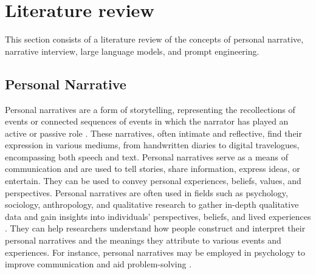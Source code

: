 \chapter{Literature review}
\label{cha:literature_review}
This section consists of a literature review of the concepts of personal narrative, narrative interview, large language models, and prompt engineering. 


\section{Personal Narrative}
Personal narratives are a form of storytelling, representing the recollections of events or connected sequences of events in which the narrator has played an active or passive role \cite{tammewarannotation}. These narratives, often intimate and reflective, find their expression in various mediums, from handwritten diaries to digital travelogues, encompassing both speech and text. Personal narratives serve as a means of communication and are used to tell stories, share information, express ideas, or entertain. They can be used to convey personal experiences, beliefs, values, and perspectives. Personal narratives are often used in fields such as psychology, sociology, anthropology, and qualitative research to gather in-depth qualitative data and gain insights into individuals' perspectives, beliefs, and lived experiences \cite{Nurser2018-id,Charon2009-na}. They can help researchers understand how people construct and interpret their personal narratives and the meanings they attribute to various events and experiences. For instance, personal narratives may be employed in psychology to improve communication and aid problem-solving \cite{Kim2015-es}. %


